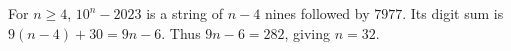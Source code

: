 For $n\ge4$, $10^n-2023$ is a string of $n-4$ nines followed by $7977$. Its digit sum is $9(n-4)+30=9n-6$. Thus $9n-6=282$, giving $\boxed{n=32}$.

